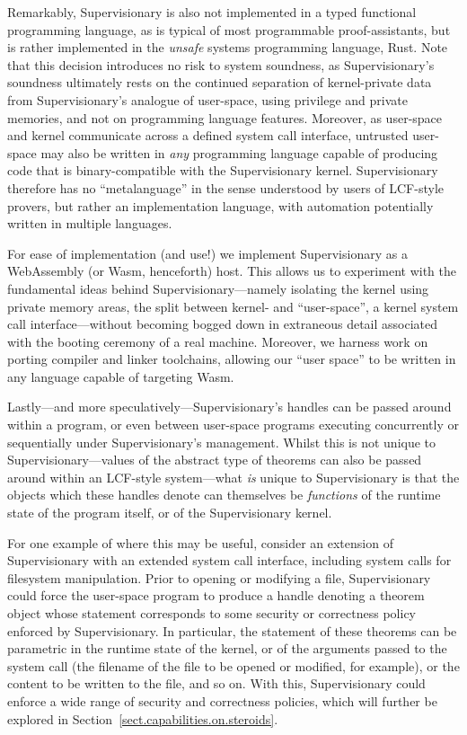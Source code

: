 \documentclass[a4paper, UKenglish, cleveref, autoref, thm-restate]{lipics-v2021}
\begin{document}
Remarkably, Supervisionary is also not implemented in a typed functional programming language, as is typical of most programmable proof-assistants, but is rather implemented in the \emph{unsafe} systems programming language, Rust.
Note that this decision introduces no risk to system soundness, as Supervisionary's soundness ultimately rests on the continued separation of kernel-private data from Supervisionary's analogue of user-space, using privilege and private memories, and not on programming language features.
Moreover, as user-space and kernel communicate across a defined system call interface, untrusted user-space may also be written in \emph{any} programming language capable of producing code that is binary-compatible with the Supervisionary kernel.
Supervisionary therefore has no ``metalanguage'' in the sense understood by users of LCF-style provers, but rather an implementation language, with automation potentially written in multiple languages.

For ease of implementation (and use!) we implement Supervisionary as a WebAssembly (or Wasm, henceforth) host.
This allows us to experiment with the fundamental ideas behind Supervisionary---namely isolating the kernel using private memory areas, the split between kernel- and ``user-space'', a kernel system call interface---without becoming bogged down in extraneous detail associated with the booting ceremony of a real machine.
Moreover, we harness work on porting compiler and linker toolchains, allowing our ``user space'' to be written in any language capable of targeting Wasm.

Lastly---and more speculatively---Supervisionary's handles can be passed around within a program, or even between user-space programs executing concurrently or sequentially under Supervisionary's management.
Whilst this is not unique to Supervisionary---values of the abstract type of theorems can also be passed around within an LCF-style system---what \emph{is} unique to Supervisionary is that the objects which these handles denote can themselves be \emph{functions} of the runtime state of the program itself, or of the Supervisionary kernel.

For one example of where this may be useful, consider an extension of Supervisionary with an extended system call interface, including system calls for filesystem manipulation.
Prior to opening or modifying a file, Supervisionary could force the user-space program to produce a handle denoting a theorem object whose statement corresponds to some security or correctness policy enforced by Supervisionary.
In particular, the statement of these theorems can be parametric in the runtime state of the kernel, or of the arguments passed to the system call (the filename of the file to be opened or modified, for example), or the content to be written to the file, and so on.
With this, Supervisionary could enforce a wide range of security and correctness policies, which will further be explored in Section~\ref{sect.capabilities.on.steroids}.
\end{document}
